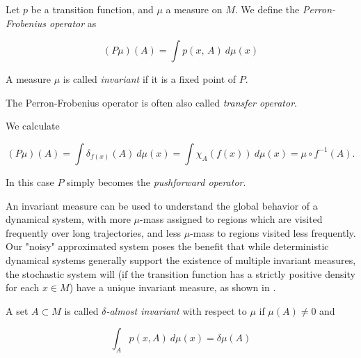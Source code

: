 \begin{definition}
    \cite*{attr} Let $p$ be a transition function, and $\mu$ a measure on $M$. 
    We define the \emph{Perron-Frobenius operator} as
    
    \begin{equation}
        (P\mu)(A) = \int p(x,\, A)\ d\mu (x)
    \end{equation}
    
    A measure $\mu$ is called \emph{invariant} if it is a fixed point of $P$.
\end{definition}

\begin{remark}
    The Perron-Frobenius operator is often also called \emph{transfer operator}.
\end{remark}

\begin{example} 
    \label{ex:pushforward}\cite*{attr} We calculate

    \begin{equation}
        (P\mu)(A) = \int \delta_{f(x)} (A)\ d\mu (x) 
        = \int \chi_A (f(x))\ d\mu (x) = \mu \circ f^{-1}(A).
    \end{equation}

    In this case $P$ simply becomes the \emph{pushforward operator}.
\end{example}

An invariant measure can be used to understand the global behavior of a dynamical 
system, with more $\mu$-mass assigned to regions which are visited frequently over long
trajectories, and less $\mu$-mass to regions visited less frequently. \\

Our "noisy" approximated system poses the benefit that while deterministic dynamical systems 
generally support the existence of multiple invariant measures, the stochastic system will 
(if the transition function has a strictly positive density for each $x \in M$) have a unique 
invariant measure, as shown in \cite*{lasota}. \\

\begin{definition}
    \cite*{attr}
    A set $A \subset M$ is called \emph{$\delta$-almost invariant} with respect to $\mu$ if 
    $\mu (A) \neq 0$ and 

    \begin{equation}
        \int_A p(x, A)\ d\mu (x) = \delta \mu (A)
    \end{equation}

\end{definition}

